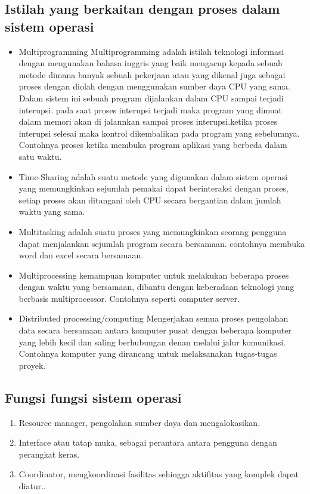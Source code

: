 	\subsection{Istilah yang berkaitan dengan proses dalam sistem operasi}
		\begin{itemize}
			\item Multiprogramming
			Multiprogramming adalah  istilah teknologi informasi dengan mengunakan bahasa inggris yang baik  mengacup kepada sebuah metode dimana banyak sebuah pekerjaan atau yang dikenal juga sebagai proses  dengan diolah dengan menggunakan sumber daya CPU yang sama. Dalam sistem ini sebuah program dijalankan dalam CPU sampai terjadi interupsi. pada saat proses interupsi terjadi maka program yang dimuat dalam memori akan di jalannkan sampai proses interupsi.ketika proses interupsi selesai maka kontrol dikembalikan pada program yang sebelumnya.
			Contohnya proses ketika membuka program aplikasi yang berbeda dalam satu waktu.
			\item Time-Sharing adalah suatu metode yang digunakan dalam sistem operasi yang memungkinkan sejumlah pemakai dapat berinteraksi dengan proses, setiap proses akan ditangani oleh CPU secara bergantian dalam jumlah waktu yang sama.
			\item Multitasking adalah suatu proses yang memungkinkan seorang pengguna dapat menjalankan sejumlah program secara bersamaan.
			contohnya membuka word dan excel secara bersamaan.
			\item Multiprocessing
			kemampuan komputer untuk melakukan beberapa proses dengan waktu yang bersamaan, dibantu dengan keberadaan teknologi yang berbasis multiprocessor.
			Contohnya seperti computer server.
			\item Distributed processing/computing
			Mengerjakan semua proses pengolahan data secara bersamaan antara komputer pusat dengan beberapa komputer yang lebih kecil dan saling berhubungan denan melalui jalur komunikasi.
			Contohnya komputer yang dirancang untuk melaksanakan tugas-tugas proyek.
		\end{itemize}
		
	\subsection{Fungsi fungsi sistem operasi}
		\begin{enumerate}
			\item Resource manager, pengolahan sumber daya dan mengalokasikan.
			\item Interface atau tatap muka, sebagai perantara antara pengguna dengan perangkat keras.
			\item Coordinator, mengkoordinasi fasilitas sehingga aktifitas yang komplek dapat diatur..
		\end{enumerate}
		
